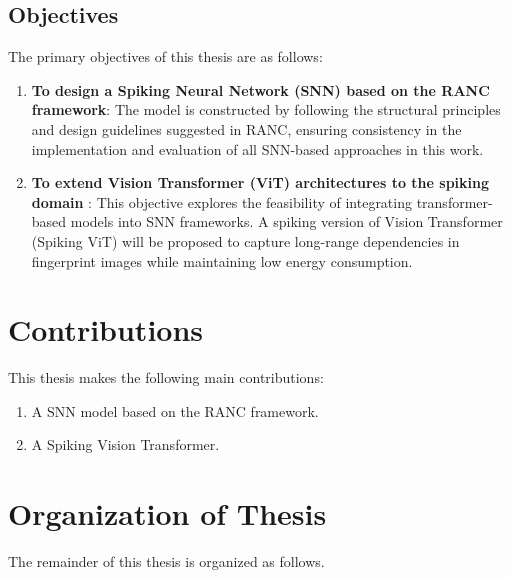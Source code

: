 \documentclass[../main.tex]{subfiles}
\begin{document}
\subsection{Objectives}
The primary objectives of this thesis are as follows:

\begin{enumerate}[label=\Roman*.]
    \item \textbf{To design a Spiking Neural Network (SNN) based on the RANC framework}: The model is constructed by following the structural principles and design guidelines suggested in RANC, ensuring consistency in the implementation and evaluation of all SNN-based approaches in this work.
    \item \textbf{To extend Vision Transformer (ViT) architectures to the spiking domain
    }: This objective explores the feasibility of integrating transformer-based models into SNN frameworks. A spiking version of Vision Transformer (Spiking ViT) will be proposed to capture long-range dependencies in fingerprint images while maintaining low energy consumption.
\end{enumerate}

\section{Contributions}
This thesis makes the following main contributions:
\begin{enumerate}[label=\Roman*.]
    \item A SNN model based on the RANC framework.
    \item A Spiking Vision Transformer.
\end{enumerate}

\section{Organization of Thesis}
The remainder of this thesis is organized as follows.
\end{document}

